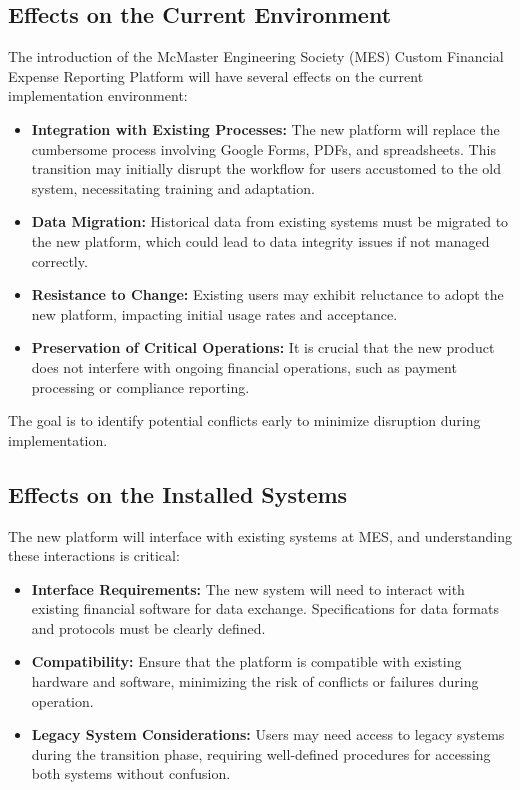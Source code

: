 \documentclass[12pt]{article}
\begin{document}
\subsection{Effects on the Current Environment}
The introduction of the McMaster Engineering Society (MES) Custom Financial Expense Reporting Platform will have several effects on the current implementation environment:

\begin{itemize}
    \item \textbf{Integration with Existing Processes:} The new platform will replace the cumbersome process involving Google Forms, PDFs, and spreadsheets. This transition may initially disrupt the workflow for users accustomed to the old system, necessitating training and adaptation.
    \item \textbf{Data Migration:} Historical data from existing systems must be migrated to the new platform, which could lead to data integrity issues if not managed correctly.
    \item \textbf{Resistance to Change:} Existing users may exhibit reluctance to adopt the new platform, impacting initial usage rates and acceptance.
    \item \textbf{Preservation of Critical Operations:} It is crucial that the new product does not interfere with ongoing financial operations, such as payment processing or compliance reporting.
\end{itemize}

The goal is to identify potential conflicts early to minimize disruption during implementation.

\subsection{Effects on the Installed Systems}
The new platform will interface with existing systems at MES, and understanding these interactions is critical:

\begin{itemize}
    \item \textbf{Interface Requirements:} The new system will need to interact with existing financial software for data exchange. Specifications for data formats and protocols must be clearly defined.
    \item \textbf{Compatibility:} Ensure that the platform is compatible with existing hardware and software, minimizing the risk of conflicts or failures during operation.
    \item \textbf{Legacy System Considerations:} Users may need access to legacy systems during the transition phase, requiring well-defined procedures for accessing both systems without confusion.
\end{itemize}
\end{document}
